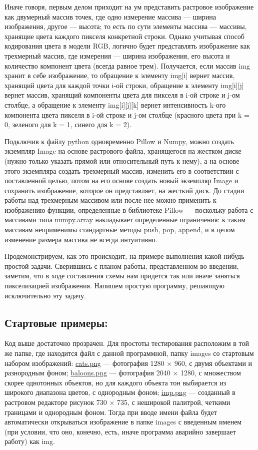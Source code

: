 \documentclass[12pt]{article}
\begin{document}
{	Иначе говоря, первым делом приходит на ум представить растровое изображение как двумерный массив точек, где одно измерение массива --- ширина изображения, другое --- высота; то есть по сути элементы массива --- массивы, хранящие цвета каждого пикселя конкретной строки. Однако учитывая способ кодирования цвета в модели RGB, логично будет представлять изображение как трехмерный массив, где измерения --- ширина изображения, его высота и количество компонент цвета (всегда равное трем). Получается, если массив img хранит в себе изображение, то обращение к элементу img[i] вернет массив, хранящий цвета для каждой точки i-ой строки, обращение к элементу img[i][j] вернет массив, хранящий компоненты цвета для пикселя в i-ой строке и j-ом столбце, а обращение к элементу img[i][j][k] вернет интенсивность k-ого компонента цвета пикселя в i-ой строке и j-ом столбце (красного цвета при k = 0, зеленого для k = 1, синего для k = 2).
	
	Подключив к файлу python одновременно Pillow и Numpy, можно создать экземпляр Image на основе растрового файла, хранящегося на жестком диске (нужно только указать прямой или относительный путь к нему), а на основе этого экземпляра создать трехмерный массив, изменить его в соответствии с поставленной целью, потом на его основе создать новый экземпляр Image и сохранить изображение, которое он представляет, на жесткий диск. До стадии работы над трехмерным массивом или после нее можно применить к изображению функции, определенные в библиотеке Pillow --- поскольку работа с массивами типа numpy.array накладывает определенные ограничения: к таким массивам неприменимы стандартные методы push, pop, append, и в целом изменение размера массива не всегда интуитивно.
	
	Продемонстрируем, как это происходит, на примере выполнения какой-нибудь простой задачи. Сверившись с планом работы, представленном во введении, заметим, что в ходе составления схемы нам придется так или иначе заняться пикселизацией изображения. Напишем простую программу, решающую исключительно эту задачу.
	
	\subsection{Стартовые примеры:}
	\label{base_examples}

	
	
	Код выше достаточно прозрачен. Для простоты тестирования расположим в той же папке, где находится файл с данной программной, папку images со стартовым набором изображений: \hyperref[cats]{cats.png} --- фотография 1280 $\times$ 960, с двумя объектами и разнородным фоном; \hyperref[baloons]{baloons.png} --- фотография 2040 $\times$ 1280, с множеством скорее однотонных объектов, но для каждого объекта тон выбирается из широкого диапазона цветов, с однородным фоном; \hyperref[imp]{imp.png} --- созданный в растровом редакторе рисунок 730 $\times$ 735, с неширокой палитрой, четкими границами и однородным фоном. Тогда при вводе имени файла будет автоматически открываться изображение в папке images с введенным именем (при условии, что оно, конечно, есть, иначе программа аварийно завершает работу) как img.  
	
}
\end{document}
